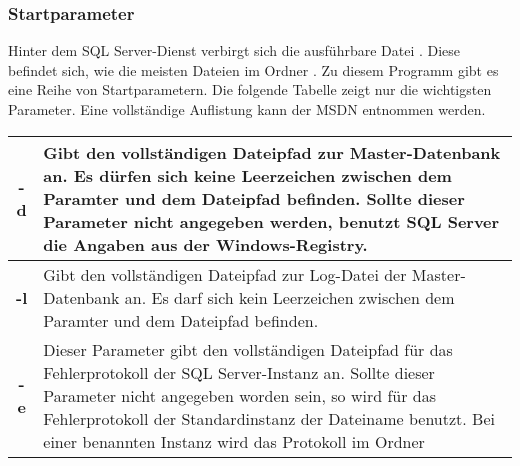         \subsubsection{Startparameter}
          Hinter dem SQL Server-Dienst verbirgt sich die ausführbare Datei
          . Diese befindet sich, wie die meisten
           Dateien im Ordner . Zu diesem
          Programm gibt es eine Reihe von Startparametern. Die folgende Tabelle zeigt nur die
          wichtigsten Parameter. Eine vollständige Auflistung kann der MSDN
          entnommen werden.
          \begin{literaturinternet}
            \item \cite{ms162819}
          \end{literaturinternet}
          \begin{center}
            \begin{small}
            \tablefirsthead {
              \hline
            }
            \tablehead{
            }
            \tabletail {
              \hline
            }
            \tablelasttail {
              \hline
            }
              \begin{supertabular}{|c|p{10cm}|}
                \textbf{-d} & Gibt den vollständigen Dateipfad zur
                Master-Datenbank an. Es dürfen sich keine Leerzeichen zwischen
                dem Paramter und dem Dateipfad befinden. Sollte dieser Parameter
                nicht angegeben werden, benutzt SQL Server die Angaben aus der
                Windows-Registry. \\
                \hline
                \textbf{-l} & Gibt den vollständigen Dateipfad zur Log-Datei der
                Master-Datenbank an. Es darf sich kein Leerzeichen zwischen dem
                Paramter und dem Dateipfad befinden. \\
                \hline
                \textbf{-e} & Dieser Parameter gibt den vollständigen Dateipfad
                für das Fehler\-protokoll der SQL Server-Instanz an. Sollte
                dieser Parameter nicht angegeben worden sein, so wird für das Fehlerprotokoll der
                Standardinstanz der Dateiname  benutzt. Bei
                einer benannten Instanz wird das Protokoll im Ordner 
\end{supertabular}
\end{small}
\end{center}
